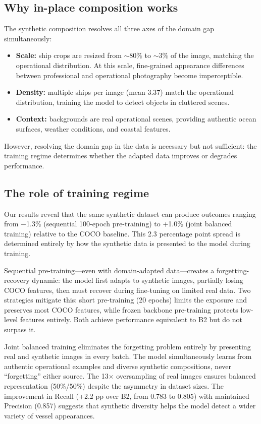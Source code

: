 \documentclass[a4paper,fleqn]{cas-dc}
\begin{document}
\subsection{Why in-place composition works}

The synthetic composition resolves all three axes of the domain gap simultaneously:

\begin{itemize}
    \item \textbf{Scale:} ship crops are resized from $\sim$80\% to $\sim$3\% of the image, matching the operational distribution. At this scale, fine-grained appearance differences between professional and operational photography become imperceptible.
    \item \textbf{Density:} multiple ships per image (mean 3.37) match the operational distribution, training the model to detect objects in cluttered scenes.
    \item \textbf{Context:} backgrounds are real operational scenes, providing authentic ocean surfaces, weather conditions, and coastal features.
\end{itemize}

However, resolving the domain gap in the data is necessary but not sufficient: the training regime determines whether the adapted data improves or degrades performance.

\subsection{The role of training regime}

Our results reveal that the same synthetic dataset can produce outcomes ranging from $-$1.3\% (sequential 100-epoch pre-training) to +1.0\% (joint balanced training) relative to the COCO baseline. This 2.3 percentage point spread is determined entirely by how the synthetic data is presented to the model during training.

Sequential pre-training---even with domain-adapted data---creates a forgetting-recovery dynamic: the model first adapts to synthetic images, partially losing COCO features, then must recover during fine-tuning on limited real data. Two strategies mitigate this: short pre-training (20 epochs) limits the exposure and preserves most COCO features, while frozen backbone pre-training protects low-level features entirely. Both achieve performance equivalent to B2 but do not surpass it.

Joint balanced training eliminates the forgetting problem entirely by presenting real and synthetic images in every batch. The model simultaneously learns from authentic operational examples and diverse synthetic compositions, never ``forgetting'' either source. The 13$\times$ oversampling of real images ensures balanced representation (50\%/50\%) despite the asymmetry in dataset sizes. The improvement in Recall (+2.2 pp over B2, from 0.783 to 0.805) with maintained Precision (0.857) suggests that synthetic diversity helps the model detect a wider variety of vessel appearances.
\end{document}
